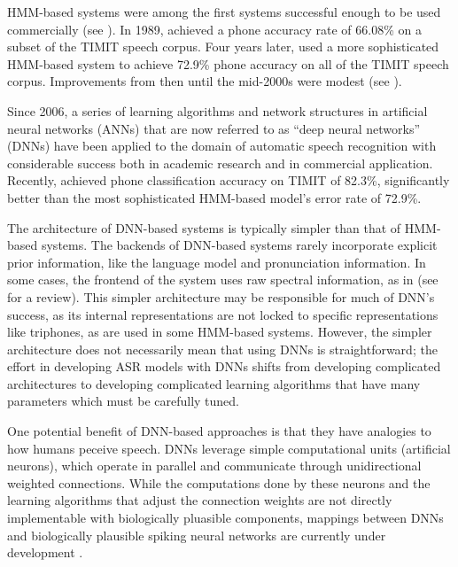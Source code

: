 
HMM-based systems
were among the first systems
successful enough to be
used commercially
(see \citealt{huang2014}).
In 1989, \citet{lee1989}
achieved a phone accuracy rate of
66.08\% on a subset of the
TIMIT speech corpus.
Four years later,
\citet{lamel1993}
used a more sophisticated HMM-based system
to achieve 72.9\% phone accuracy on
all of the TIMIT speech corpus.
Improvements from then until
the mid-2000s were modest
(see \citealt{lopes2011}).

Since 2006, a series of learning algorithms
and network structures in artificial neural networks (ANNs)
that are now referred to as ``deep neural networks'' (DNNs)
have been applied to
the domain of automatic speech recognition
with considerable success
both in academic research
and in commercial application.
Recently, \citet{graves2013}
achieved phone classification accuracy
on TIMIT of 82.3\%,
significantly better than the most sophisticated
HMM-based model's error rate of 72.9\%.

The architecture of DNN-based systems
is typically simpler
than that of HMM-based systems.
The backends of DNN-based systems
rarely incorporate explicit
prior information,
like the language model
and pronunciation information.
In some cases,
the frontend of the system
uses raw spectral information,
as in \citet{mohamed2012}
(see \citealt{hinton2012}
for a review).
This simpler architecture may be
responsible for much of DNN's success,
as its internal representations
are not locked to specific representations
like triphones,
as are used in some HMM-based systems.
However, the simpler architecture
does not necessarily mean that
using DNNs is straightforward;
the effort in developing ASR models
with DNNs shifts from
developing complicated architectures
to developing complicated learning algorithms
that have many parameters
which must be carefully tuned.

One potential benefit of DNN-based approaches
is that they have analogies to
how humans peceive speech.
DNNs leverage simple computational units
(artificial neurons),
which operate in parallel
and communicate through unidirectional
weighted connections.
While the computations done by these neurons
and the learning algorithms that adjust
the connection weights
are not directly implementable
with biologically pluasible components,
mappings between DNNs
and biologically plausible spiking neural networks
are currently under development
\citep{hunsberger2015}.

